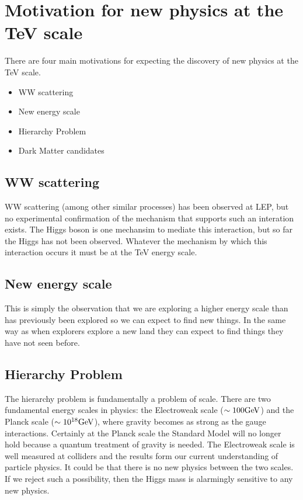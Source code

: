 \section{Motivation for new physics at the TeV scale}

There are four main motivations for expecting the discovery of new physics at 
the TeV scale.

\begin{itemize}
\item WW scattering
\item New energy scale
\item Hierarchy Problem
\item Dark Matter candidates
\end{itemize}

\subsection{WW scattering}

WW scattering (among other similar processes) has been observed at LEP, but
no experimental confirmation of the mechanism that supports such an interation
exists. The Higgs boson is one mechansim to mediate this interaction, but so far
the Higgs has not been observed. Whatever the mechanism by which this
interaction occurs it must be at the TeV energy scale. \\

\subsection{New energy scale}

This is simply the observation that we are exploring a higher energy scale than
has previously been explored so we can expect to find new things. In the same
way as when explorers explore a new land they can expect to find things they
have not seen before.

\subsection{Hierarchy Problem}

The hierarchy problem is fundamentally a problem of scale. There are two
fundamental energy scales in physics: the Electroweak scale ($\sim100\mbox{GeV}$) and
the Planck scale ($\sim10^{18}\mbox{GeV}$), where gravity becomes as strong as the 
gauge interactions. Certainly at the Planck scale the Standard Model will no
longer hold because a quantum treatment of gravity is needed. The Electroweak 
scale is well measured at colliders and the results form our current 
understanding of particle physics. It could be that there is no new physics 
between the two scales. If we reject such a possibility, then the Higgs mass is
alarmingly sensitive to any new physics. \\

